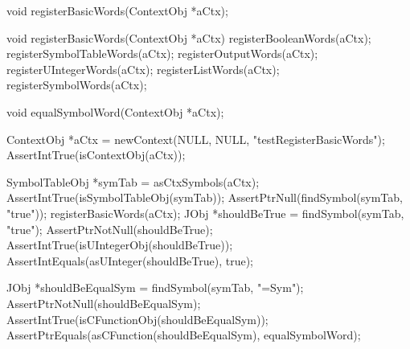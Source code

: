 \startTestSuite[registerBasicWords]

\startCHeader
void registerBasicWords(ContextObj *aCtx);
\stopCHeader

\startCCode
void registerBasicWords(ContextObj *aCtx) {
  registerBooleanWords(aCtx);
  registerSymbolTableWords(aCtx);
  registerOutputWords(aCtx);
  registerUIntegerWords(aCtx);
  registerListWords(aCtx);
  registerSymbolWords(aCtx);
}
\stopCCode


\startCHeader
void equalSymbolWord(ContextObj *aCtx);
\stopCHeader

\startCTest
  ContextObj *aCtx = newContext(NULL, NULL, "testRegisterBasicWords");
  AssertIntTrue(isContextObj(aCtx));
  
  SymbolTableObj *symTab = asCtxSymbols(aCtx);
  AssertIntTrue(isSymbolTableObj(symTab));
  AssertPtrNull(findSymbol(symTab, "true"));
  registerBasicWords(aCtx);
  JObj *shouldBeTrue = findSymbol(symTab, "true");
  AssertPtrNotNull(shouldBeTrue);
  AssertIntTrue(isUIntegerObj(shouldBeTrue));
  AssertIntEquals(asUInteger(shouldBeTrue), true);
  
  JObj *shouldBeEqualSym = findSymbol(symTab, "=Sym");
  AssertPtrNotNull(shouldBeEqualSym);
  AssertIntTrue(isCFunctionObj(shouldBeEqualSym));
  AssertPtrEquals(asCFunction(shouldBeEqualSym), equalSymbolWord);
\stopCTest

\stopTestCase
\stopTestSuite